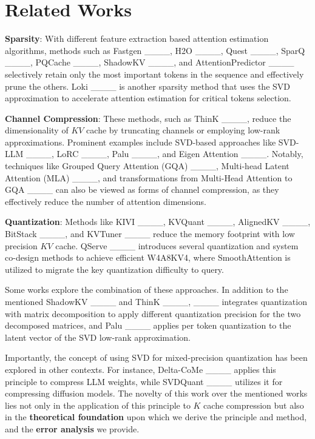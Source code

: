 \section{Related Works}
\label{sec:relatedworks}

\textbf{Sparsity}: With different feature extraction based attention estimation algorithms, methods such as Fastgen ____, H2O ____, Quest ____, SparQ ____, PQCache ____, ShadowKV ____, and AttentionPredictor ____ selectively retain only the most important tokens in the sequence and effectively prune the others. Loki ____ is another sparsity method that uses the SVD approximation to accelerate attention estimation for critical tokens selection.
 
\noindent \textbf{Channel Compression}: These methods, such as ThinK ____, reduce the dimensionality of $KV$ cache by truncating channels or employing low-rank approximations. Prominent examples include SVD-based approaches like SVD-LLM ____, LoRC ____, Palu ____, and Eigen Attention ____. Notably, techniques like Grouped Query Attention (GQA) ____, Multi-head Latent Attention (MLA) ____, and transformations from Multi-Head Attention to GQA ____ can also be viewed as forms of channel compression, as they effectively reduce the number of attention dimensions.

\noindent \textbf{Quantization}: Methods like KIVI ____, KVQuant ____, AlignedKV ____, BitStack ____, and KVTuner ____ reduce the memory footprint with low precision $KV$ cache. QServe ____ introduces several quantization and system co-design methods to achieve efficient W4A8KV4, where SmoothAttention is utilized to migrate the key quantization difficulty to query.

Some works explore the combination of these approaches. In addition to the mentioned ShadowKV ____ and ThinK ____, ____ integrates quantization with matrix decomposition to apply different quantization precision for the two decomposed matrices, and Palu ____ applies per token quantization to the latent vector of the SVD low-rank approximation.

Importantly, the concept of using SVD for mixed-precision quantization has been explored in other contexts. For instance, Delta-CoMe ____ applies this principle to compress LLM weights, while SVDQuant ____ utilizes it for compressing diffusion models. The novelty of this work over the mentioned works lies not only in the application of this principle to $K$ cache compression but also in the \textbf{theoretical foundation} upon which we derive the principle and method, and the \textbf{error analysis} we provide.